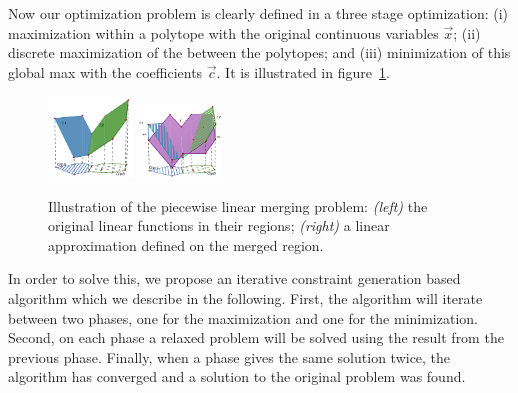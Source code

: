 Now our optimization problem is clearly defined in a three stage optimization: (i) maximization within a polytope with the original continuous variables $\vec{x}$; (ii) discrete maximization of the between the polytopes; and (iii) minimization of this global max with the coefficients $\vec{c}$. It is illustrated in figure~\ref{fig:optim}.

\begin{figure}[h!t]
\center
\includegraphics[trim = 2cm 0cm 2cm 0cm, height=0.25\textwidth,width=0.2\textwidth]{Figures/optimDiag/optdiagram1.pdf} 
\hspace{2mm}
\includegraphics[trim = 2cm 0cm 2cm 0cm, height=0.25\textwidth,width=0.2\textwidth]{Figures/optimDiag/optdiagram2.pdf}
\caption{Illustration of the piecewise linear merging problem: \emph{(left)} the original linear functions in their regions; \emph{(right)} a linear approximation defined on the merged region.}
\label{fig:optim} 
\end{figure}


In order to solve this, we propose an iterative constraint generation based algorithm which we describe in the following. First, the algorithm will iterate between two phases, one for the maximization and one for the minimization.  Second, on each phase a relaxed problem will be solved using the result from the previous phase. Finally, when a phase gives the same solution twice, the algorithm has converged and a solution to the original problem was found.

